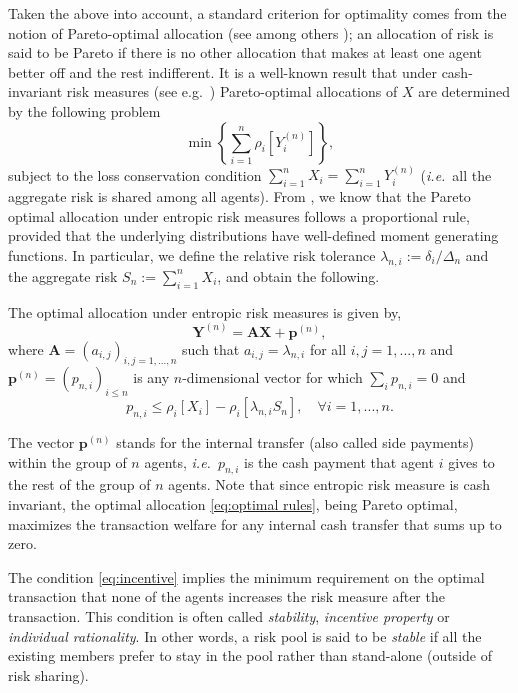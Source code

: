 \documentclass[fleqn,mnsc,nonblindrev]{informs4}
\begin{document}
Taken the above into account, a standard criterion for optimality comes from the notion of Pareto-optimal allocation (see among others \cite{borch1962equilibrium}); an allocation of risk is said to be Pareto if there is no other allocation that makes at least one agent better off and the rest indifferent. It is a well-known result that under cash-invariant risk measures (see e.g.~\cite{jouini2008optimal}) Pareto-optimal allocations of $X$ are determined by the following problem 
\begin{equation}\label{eq:sharingproblem}
\min\left\{\sum_{i=1}^n\rho_i[Y_i^{(n)}]\right\},
\end{equation}
subject to the loss conservation condition  {$\sum_{i=1}^n X_i=\sum_{i=1}^n Y_i^{(n)}$} ({\it i.e.}~all the aggregate risk is shared among all agents). 
From \cite{barrieu2005inf}, we know that the Pareto optimal allocation under entropic risk measures follows a proportional rule,  {provided that the underlying distributions have well-defined moment generating functions}. In particular, we define  {the relative risk tolerance $\lambda_{n,i}:=\delta_i/\Delta_n$ and the aggregate risk $S_n:=\sum_{i=1}^n X_i$}, and obtain the following. 
\begin{theorem}\label{thm:optimalsharing}
The optimal allocation under entropic risk measures is given by, 
\begin{equation}\label{eq:optimal rules}
\mathbf{Y}^{(n)}=\mathbf{A}\mathbf{X}+\mathbf{p}^{(n)},
\end{equation}
where $\mathbf{A}=(a_{i,j})_{i,j=1,...,n}$ such that $a_{i,j}=\lambda_{n,i}$ for all $i,j=1,...,n$ and $\mathbf{p}^{(n)}=(p_{n,i})_{i\leq n}$ is any $n$-dimensional vector for which   {$\sum_{i}p_{n,i}=0$} and 
\begin{equation}\label{eq:incentive}
p_{n,i}\leq \rho_i\left[X_i\right]-\rho_i\left[\lambda_{n,i}S_n\right] ,\quad\forall i=1,...,n.
\end{equation}
\end{theorem}
 The vector $\mathbf{p}^{(n)}$ stands for the internal transfer (also called side payments) within the group of $n$ agents, {\it i.e.}~$p_{n,i}$ is the cash payment that agent $i$ gives to the rest of the group of $n$ agents.    {Note that since entropic risk measure is cash invariant, the optimal allocation \eqref{eq:optimal rules}, being Pareto optimal, maximizes the transaction welfare for any internal cash transfer that sums up to zero.}
 
 The condition \eqref{eq:incentive} implies the minimum requirement on the optimal transaction that none of the agents increases the risk measure after the transaction. This condition is often called \textit{stability}, \textit{incentive property} or \textit{individual rationality}. In other words, a risk pool is said to be \textit{stable} if all the existing members prefer to stay in the pool rather than stand-alone (outside of risk sharing).  
\end{document}
